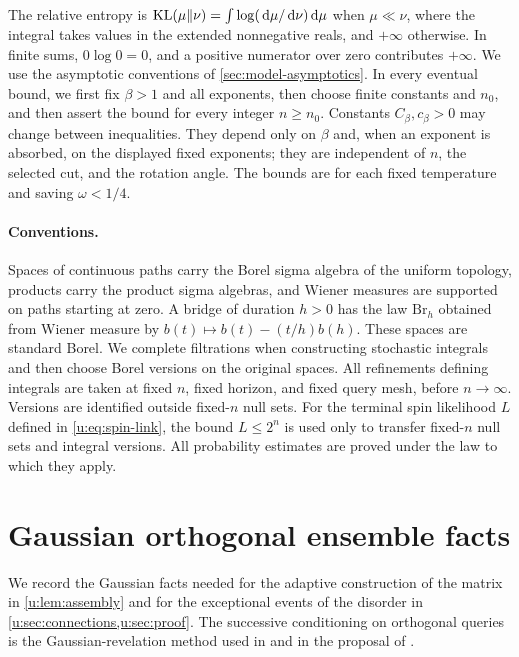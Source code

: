 The relative entropy is
$\operatorname{KL}(\mu\Vert\nu)=\int\log(\,\mathrm d\mu/\,\mathrm d\nu)\,\mathrm d\mu$ when
$\mu\ll\nu$, where the integral takes values in the extended
nonnegative reals, and $+\infty$ otherwise. In finite sums, $0\log0=0$, and a positive numerator over
zero contributes $+\infty$. We use the asymptotic conventions of
\cref{sec:model-asymptotics}. In every eventual bound, we first fix
$\beta>1$ and all exponents, then choose finite constants and $n_0$,
and then assert the bound for every integer $n\ge n_0$. Constants $C_\beta,c_\beta>0$ may change between
inequalities. They depend only on $\beta$ and, when an exponent is
absorbed, on the displayed fixed exponents; they are independent of
$n$, the selected cut, and the rotation angle. The bounds are for
each fixed temperature and saving $\omega<1/4$.

\paragraph{Conventions.}\label{u:par:conventions}
Spaces of continuous paths carry the Borel sigma algebra of the
uniform topology, products carry the product sigma algebras, and
Wiener measures are supported on paths starting at zero. A bridge of duration $h>0$ has the law $\mathrm{Br}_h$
obtained from Wiener measure by $b(t)\mapsto b(t)-(t/h)b(h)$.
These spaces are standard Borel. We complete filtrations when
constructing stochastic integrals and then choose Borel versions on
the original spaces. All refinements defining integrals are taken at
fixed $n$, fixed horizon, and fixed query mesh, before $n\to\infty$.
Versions are identified outside fixed-$n$ null sets. For the terminal
spin likelihood $L$ defined in \eqref{u:eq:spin-link}, the bound
$L\le2^n$ is used only to transfer fixed-$n$ null sets and integral
versions. All probability estimates are proved under the law to which
they apply.

\section{Gaussian orthogonal ensemble facts}\label{u:sec:goe}

We record the Gaussian facts needed for the adaptive construction of
the matrix in \cref{u:lem:assembly} and for the exceptional events of
the disorder in \cref{u:sec:connections,u:sec:proof}. The successive
conditioning on orthogonal queries is the Gaussian-revelation method
used in \cite[Sections~2--3]{bolthausen-2014} and in the proposal of
\cite[Section~4.1]{oai-typical-upper}.

